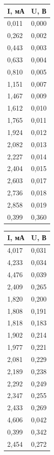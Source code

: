 \documentclass[a4paper,12pt]{article}
\begin{document}
\begin{minipage}[c]{0.33\linewidth}
\begin{tabular}{|l|l|}
\hline
I, мА & U, В \\ \hline
0,011 & 0,000 \\ \hline
0,262 & 0,002 \\ \hline
0,443 & 0,003 \\ \hline
0,633 & 0,004 \\ \hline
0,810 & 0,005 \\ \hline
1,151 & 0,007 \\ \hline
1,467 & 0,009 \\ \hline
1,612 & 0,010 \\ \hline
1,765 & 0,011 \\ \hline
1,924 & 0,012 \\ \hline
2,082 & 0,013 \\ \hline
2,227 & 0,014 \\ \hline
2,404 & 0,015 \\ \hline
2,603 & 0,017 \\ \hline
2,736 & 0,018 \\ \hline
2,858 & 0,019 \\ \hline
0,399 & 0,360 \\ \hline
\end{tabular}
\end{minipage}
\begin{minipage}[c]{0.33\linewidth}
\begin{tabular}{|l|l|}
\hline
I, мА & U, В \\ \hline
4,017 & 0,031 \\ \hline
4,233 & 0,034 \\ \hline
4,476 & 0,039 \\ \hline
2,409 & 0,265 \\ \hline
1,820 & 0,200 \\ \hline
1,808 & 0,191 \\ \hline
1,818 & 0,183 \\ \hline
1,902 & 0,214 \\ \hline
1,977 & 0,221 \\ \hline
2,081 & 0,229 \\ \hline
2,189 & 0,238 \\ \hline
2,292 & 0,249 \\ \hline
2,347 & 0,255 \\ \hline
2,433 & 0,269 \\ \hline
4,606 & 0,042 \\ \hline
0,399 & 0,342 \\ \hline
2,454 & 0,272 \\ \hline
\end{tabular}
\end{minipage}
\end{document}
